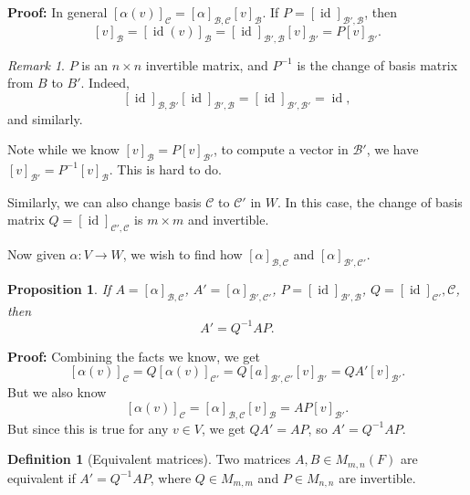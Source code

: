 \documentclass[12pt]{article}
\DeclareMathOperator{\id}{id}
\newtheorem{proposition}{Proposition}[section]
\theoremstyle{definition}
\newtheorem{definition}{Definition}[section]
\theoremstyle{remark}
\newtheorem*{remark}{Remark}
\begin{document}
\begin{adjustbox}{minipage = \columnwidth - 25.5pt, margin=1em, frame=1pt, margin=0em}
	\textbf{Proof:} In general $[\alpha(v)]_{\mathcal{C}} = [\alpha]_{\mathcal{B}, \mathcal{C}} [v]_{\mathcal{B}}$. If $P = [\id]_{\mathcal{B}', \mathcal{B}}$, then
	\[
		[v]_{\mathcal{B}} = [\id(v)]_{\mathcal{B}} = [\id]_{\mathcal{B}', \mathcal{B}} [v]_{\mathcal{B}'} = P[v]_{\mathcal{B}'}
	.\]
\end{adjustbox}

\begin{remark} 
	$P$ is an $n \times n$ invertible matrix, and $P^{-1}$ is the change of basis matrix from $B$ to $B'$. Indeed,
	\[
		[\id]_{\mathcal{B}, \mathcal{B}'} [\id]_{\mathcal{B}', \mathcal{B}} = [\id]_{\mathcal{B}', \mathcal{B}'} = \id
	,\]
	and similarly.
\end{remark}

Note while we know $[v]_{\mathcal{B}} = P [v]_{\mathcal{B}'}$, to compute a vector in $\mathcal{B}'$, we have $[v]_{\mathcal{B}'} = P^{-1}[v]_{\mathcal{B}}$. This is hard to do.

Similarly, we can also change basis $\mathcal{C}$ to $\mathcal{C}'$ in $W$. In this case, the change of basis matrix $Q = [\id]_{\mathcal{C}', \mathcal{C}}$ is $m \times m$ and invertible.

Now given $\alpha : V \to W$, we wish to find how $[\alpha]_{\mathcal{B}, \mathcal{C}}$ and $[\alpha]_{\mathcal{B}', \mathcal{C}'}$.

\begin{proposition}
	If $A = [\alpha]_{\mathcal{B}, \mathcal{C}}$, $A' = [\alpha]_{\mathcal{B}', \mathcal{C}'}$, $P = [\id]_{\mathcal{B}', \mathcal{B}}$, $Q = [\id]_{\mathcal{C}'}, \mathcal{C}$, then
	\[
	A' = Q^{-1}AP
	.\]
\end{proposition}

\begin{adjustbox}{minipage = \columnwidth - 25.5pt, margin=1em, frame=1pt, margin=0em}
\textbf{Proof:} Combining the facts we know, we get
\[
	[\alpha(v)]_{\mathcal{C}} = Q[\alpha(v)]_{\mathcal{C}'} = Q[a]_{\mathcal{B}', \mathcal{C}'} [v]_{\mathcal{B}'} = Q A' [v]_{\mathcal{B}'}.
\]
But we also know
\[
	[\alpha(v)]_{\mathcal{C}} = [\alpha]_{\mathcal{B}, \mathcal{C}}[v]_{\mathcal{B}} = A P [v]_{\mathcal{B}'}
.\]
But since this is true for any $v \in V$, we get $QA' = AP$, so $A' = Q^{-1}AP$.
\end{adjustbox}

\begin{definition}[Equivalent matrices]
	Two matrices $A, B \in M_{m, n}(F)$ are equivalent if $A' = Q^{-1}AP$, where $Q \in M_{m, m}$ and $P \in M_{n, n}$ are invertible.
\end{definition}
\end{document}
